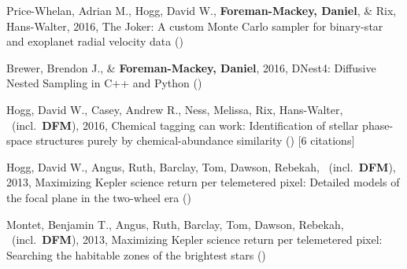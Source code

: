 \item[{\color{numcolor}\scriptsize5}] Price-Whelan, Adrian M., Hogg, David W., \textbf{Foreman-Mackey, Daniel}, \& Rix, Hans-Walter, 2016, The Joker: A custom Monte Carlo sampler for binary-star and exoplanet radial velocity data ()

\item[{\color{numcolor}\scriptsize4}] Brewer, Brendon J., \& \textbf{Foreman-Mackey, Daniel}, 2016, DNest4: Diffusive Nested Sampling in C++ and Python ()

\item[{\color{numcolor}\scriptsize3}] Hogg, David W., Casey, Andrew R., Ness, Melissa, Rix, Hans-Walter, \etal\ (incl.\ \textbf{DFM}), 2016, Chemical tagging can work: Identification of stellar phase-space structures purely by chemical-abundance similarity () [6 citations]

\item[{\color{numcolor}\scriptsize2}] Hogg, David W., Angus, Ruth, Barclay, Tom, Dawson, Rebekah, \etal\ (incl.\ \textbf{DFM}), 2013, Maximizing Kepler science return per telemetered pixel: Detailed models of the focal plane in the two-wheel era ()

\item[{\color{numcolor}\scriptsize1}] Montet, Benjamin T., Angus, Ruth, Barclay, Tom, Dawson, Rebekah, \etal\ (incl.\ \textbf{DFM}), 2013, Maximizing Kepler science return per telemetered pixel: Searching the habitable zones of the brightest stars ()